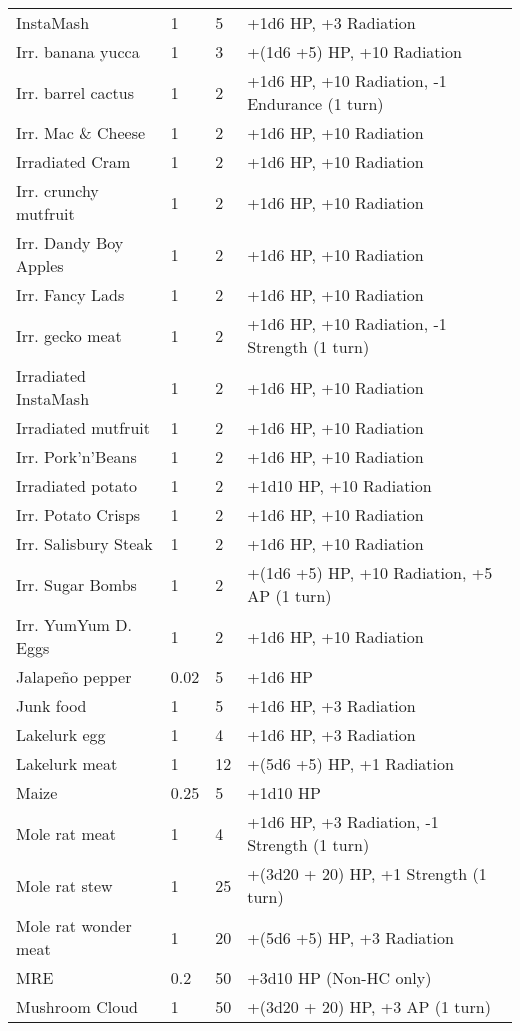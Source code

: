 \begin{longtable}{|p{4cm}|p{1.5cm}|p{1.5cm}|p{9cm}|}
InstaMash  & 1 & 5 & +1d6 HP, +3 Radiation \\
Irr. banana yucca  & 1 & 3 & +(1d6 +5) HP, +10 Radiation \\
Irr. barrel cactus  & 1 & 2 & +1d6 HP, +10 Radiation, -1 Endurance (1 turn) \\
Irr. Mac  \&  Cheese  & 1 & 2 & +1d6 HP, +10 Radiation \\
Irradiated Cram  & 1 & 2 & +1d6 HP, +10 Radiation \\
Irr. crunchy mutfruit  & 1 & 2 & +1d6 HP, +10 Radiation \\
Irr. Dandy Boy Apples  & 1 & 2 & +1d6 HP, +10 Radiation \\
Irr. Fancy Lads  & 1 & 2 & +1d6 HP, +10 Radiation \\
Irr. gecko meat  & 1 & 2 & +1d6 HP, +10 Radiation, -1 Strength (1 turn) \\
Irradiated InstaMash  & 1 & 2 & +1d6 HP, +10 Radiation \\
Irradiated mutfruit  & 1 & 2 & +1d6 HP, +10 Radiation \\
Irr. Pork'n'Beans  & 1 & 2 & +1d6 HP, +10 Radiation \\
Irradiated potato  & 1 & 2 & +1d10 HP, +10 Radiation \\
Irr. Potato Crisps  & 1 & 2 & +1d6 HP, +10 Radiation \\
Irr. Salisbury Steak  & 1 & 2 & +1d6 HP, +10 Radiation \\
Irr. Sugar Bombs  & 1 & 2 & +(1d6 +5) HP, +10 Radiation, +5 AP (1 turn) \\
Irr. YumYum D. Eggs  & 1 & 2 & +1d6 HP, +10 Radiation \\
Jalapeño pepper  & 0.02  & 5 & +1d6 HP \\
Junk food  & 1 & 5 & +1d6 HP, +3 Radiation \\
Lakelurk egg  & 1 & 4 & +1d6 HP, +3 Radiation \\
Lakelurk meat  & 1 & 12 & +(5d6 +5) HP, +1 Radiation \\
Maize  & 0.25  & 5 & +1d10 HP   \\
Mole rat meat  & 1 & 4 & +1d6 HP, +3 Radiation, -1 Strength (1 turn) \\
Mole rat stew  & 1 & 25 & +(3d20 + 20) HP, +1 Strength (1 turn) \\
Mole rat wonder meat  & 1 & 20 & +(5d6 +5) HP, +3 Radiation \\
MRE  & 0.2  & 50 & +3d10 HP (Non-HC only) \\
Mushroom Cloud  & 1 & 50 & +(3d20 + 20) HP, +3 AP (1 turn) \\

\end{longtable}
